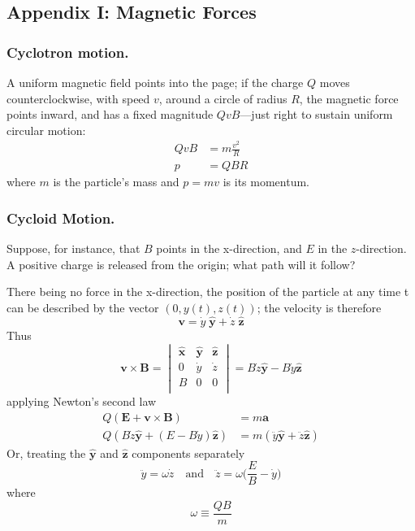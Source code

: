 \documentclass[../../../main.tex]{subfiles}
\begin{document}
\subsection{Appendix I: Magnetic Forces}
\subsubsection{Cyclotron motion.} A uniform magnetic field points into the page; if the charge $Q$ moves counterclockwise, with speed $v$, around a circle of radius $R$, the magnetic force points inward, and has a fixed magnitude $Qv B$—just right to sustain uniform circular motion:
\begin{align*}
    Qv B&=m\frac{v^2}{R}\\
    p&=QBR
\end{align*}
where $m$ is the particle’s mass and $p = mv$ is its momentum. 

\subsubsection{Cycloid Motion.} Suppose, for instance, that $B$ points in the x-direction, and $E$ in the $z$-direction. A positive charge is released from the origin; what path will it follow?

There being no force in the x-direction, the position of the particle at any time t can be described by the vector $(0, y(t), z(t))$; the velocity is therefore
\begin{equation*}
    \mathbf{v} = \dot{y}\;\mathbf{\hat{y}}+ \dot{z}\;\mathbf{\hat{z}}
\end{equation*}
Thus
\begin{equation*}
    \mathbf{v}\times \mathbf{B}=\begin{vmatrix}
        \mathbf{\hat{x}}&\mathbf{\hat{y}}&\mathbf{\hat{z}}\\
        0& \dot{y}& \dot{z}\\
        B &0& 0\\
    \end{vmatrix}=
    B \dot{z}\mathbf{\hat{y}}-B\dot{y}\mathbf{\hat{z}}
\end{equation*}
applying Newton’s second law
\begin{align*}
    Q(\mathbf{E} + \mathbf{v} \times \mathbf{B}) &= m\mathbf{a}\\
    Q(B \dot{z}\mathbf{\hat{y}}+(E-B\dot{y})\mathbf{\hat{z}})&=m(\ddot{y}\mathbf{\hat{y}}+ \ddot{z}\mathbf{\hat{z}})
\end{align*}
Or, treating the $\mathbf{\hat{y}}$ and $\mathbf{\hat{z}}$ components separately
\begin{equation*}
    \ddot{y}=\omega \dot{z}\quad\text{and}\quad    \ddot{z}=\omega\biggl(\frac{E}{B}-\dot{y}\biggr)
\end{equation*}
where
\begin{equation*}
    \omega\equiv\frac{QB}{m}
\end{equation*}
\end{document}
